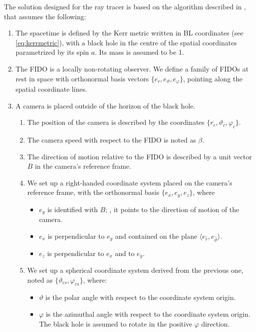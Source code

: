 The solution designed for the ray tracer is based on the algorithm described in \cite{thorne15}, that assumes the following:
\begin{enumerate}
	\item The spacetime is defined by the Kerr metric written in \ac{BL} coordinates (see \autoref{eq:kerrmetric}), with a black hole in the centre of the spatial coordinates parametrized by its spin $a$. Its mass is assumed to be 1.
	\item The \ac{FIDO} is a locally non-rotating observer. We define a family of \acp{FIDO} at rest in space with orthonormal basis vectors $\{e_r, e_\vartheta, e_\varphi\}$, pointing along the spatial coordinate lines.
	\item A camera is placed outside of the horizon of the black hole.
	\begin{enumerate}
		\item The position of the camera is described by the coordinates $\{r_c, \vartheta_c, \varphi_c\}$.
		\item The camera speed with respect to the \ac{FIDO} is noted as $\beta$.
		\item The direction of motion relative to the \ac{FIDO} is described by a unit vector $B$ in the camera's reference frame.
		\item We set up a right-handed coordinate system placed on the camera's reference frame, with the orthonormal basis $\{e_x, e_y, e_z\}$, where
		\begin{itemize}
			\item $e_y$ is identified with $B$; \ie, it points to the direction of motion of the camera.
			\item $e_x$ is perpendicular to $e_y$ and contained on the plane $\langle e_{\widehat{r}}, e_{\widehat{\vartheta}} \rangle$.
			\item $e_z$ is perpendicular to $e_x$ and to $e_y$.
		\end{itemize}
		\item We set up a spherical coordinate system derived from the previous one, noted as $\{\vartheta_{cs}, \varphi_{cs}\}$, where:
		\begin{itemize}
			\item $\vartheta$ is the polar angle with respect to the coordinate system origin.
			\item $\varphi$ is the azimuthal angle with respect to the coordinate system origin. The black hole is assumed to rotate in the positive $\varphi$ direction.
		\end{itemize}
	\end{enumerate}
\end{enumerate}

